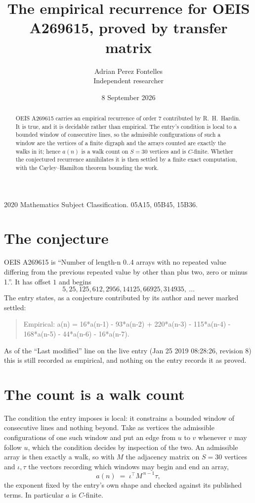 \documentclass[11pt,a4paper]{article}
\title{The empirical recurrence for OEIS A269615, proved by transfer matrix}
\author{Adrian Perez Fontelles\\ \small Independent researcher}
\date{8 September 2026}
\theoremstyle{plain}
\theoremstyle{definition}
\begin{document}
\maketitle

\begin{abstract}
OEIS A269615 carries an empirical recurrence of order $7$ contributed by R.~H.~Hardin. It is
true, and it is decidable rather than empirical. The entry's condition is local to a bounded window of consecutive lines, so
the admissible configurations of such a window are the vertices of a finite digraph and the
arrays counted are exactly the walks in it; hence $a(n)$ is a walk count on $S=30$ vertices
and is $C$-finite. Whether the conjectured recurrence annihilates it is then settled by a
finite exact computation, with the Cayley--Hamilton theorem bounding the work.
\end{abstract}

\noindent\small 2020 Mathematics Subject Classification. 05A15, 05B45, 15B36.\normalsize

\section{The conjecture}

OEIS A269615 is ``Number of length-n 0..4 arrays with no repeated value differing from the previous repeated value by other than plus two, zero or minus 1.''. It has offset $1$ and begins
\[
5, 25, 125, 612, 2956, 14125, 66925, 314935,\ \dots
\]
The entry states, as a conjecture contributed by its author and never marked settled:
\begin{quote}
Empirical: a(n) = 16*a(n-1) - 93*a(n-2) + 220*a(n-3) - 115*a(n-4) - 168*a(n-5) - 44*a(n-6) - 16*a(n-7).
\end{quote}
As of the ``Last modified'' line on the live entry (Jan 25 2019 08:28:26, revision 8) this is still
recorded as empirical, and nothing on the entry records it as proved.

\section{The count is a walk count}

The condition the entry imposes is local: it constrains a bounded window of consecutive lines and nothing beyond. Take as
vertices the admissible configurations of one such window and put an edge from $u$ to $v$
whenever $v$ may follow $u$, which the condition decides by inspection of the two. An
admissible array is then exactly a walk, so with $M$ the adjacency matrix on $S=30$ vertices
and $\iota,\tau$ the vectors recording which windows may begin and end an array,
\[
a(n)\;=\;\iota^{\!\top}M^{\,n-1}\tau ,
\]
the exponent fixed by the entry's own shape and checked against its published terms. In
particular $a$ is $C$-finite.
\end{document}
